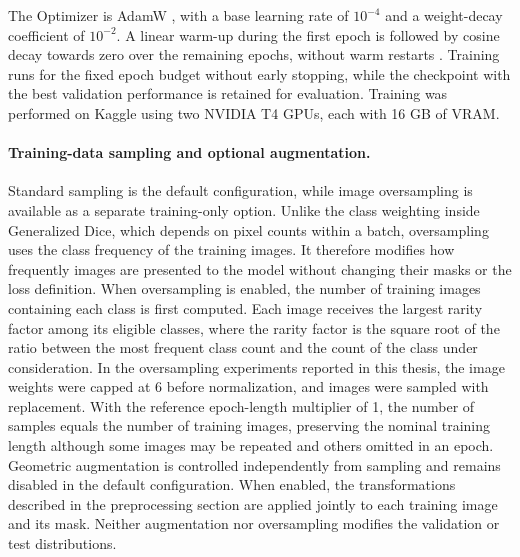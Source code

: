 The Optimizer is AdamW \cite{loshchilov2019adamw}, with a base learning rate of \(10^{-4}\) and a weight-decay coefficient of \(10^{-2}\). A linear warm-up during the first epoch is followed by cosine decay towards zero over the remaining epochs, without warm restarts \cite{loshchilov2017sgdr}. Training runs for the fixed epoch budget without early stopping, while the checkpoint with the best validation performance is retained for evaluation. Training was performed on Kaggle using two NVIDIA T4 GPUs, each with 16 GB of VRAM.

\paragraph{Training-data sampling and optional augmentation.}

Standard sampling is the default configuration, while image oversampling is available as a separate training-only option. Unlike the class weighting inside Generalized Dice, which depends on pixel counts within a batch, oversampling uses the class frequency of the training images. It therefore modifies how frequently images are presented to the model without changing their masks or the loss definition. When oversampling is enabled, the number of training images containing each class is first computed. Each image receives the largest rarity factor among its eligible classes, where the rarity factor is the square root of the ratio between the most frequent class count and the count of the class under consideration. In the oversampling experiments reported in this thesis, the image weights were capped at 6 before normalization, and images were sampled with replacement. With the reference epoch-length multiplier of 1, the number of samples equals the number of training images, preserving the nominal training length although some images may be repeated and others omitted in an epoch.
Geometric augmentation is controlled independently from sampling and remains disabled in the default configuration. When enabled, the transformations described in the preprocessing section are applied jointly to each training image and its mask. Neither augmentation nor oversampling modifies the validation or test distributions.


